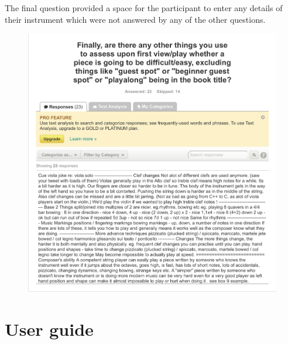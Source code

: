 \begin{appendices}
The final question provided a space for the participant to enter any details of their instrument which were not answered by any of the other questions. 
\begin{figure}[H]
\centering
\includegraphics[width=\textwidth]{survey_results/final_q}
\end{figure}
\section{User guide}


\end{appendices}
